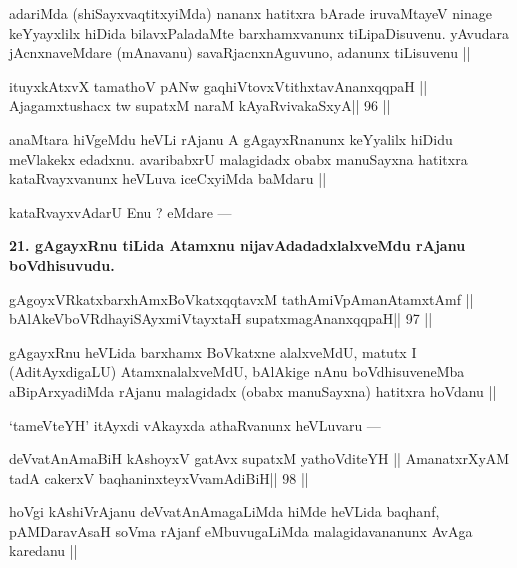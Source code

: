 \begin{artha}
adariMda (shiSayxvaqtitxyiMda) nananx hatitxra bArade iruvaMtayeV ninage keYyayxlilx hiDida bilavxPaladaMte barxhamxvanunx tiLipaDisuvenu. yAvudara jAcnxnaveMdare (mAnavanu) savaRjacnxnAguvuno, adanunx tiLisuvenu ||
\end{artha}

\begin{shl}
ituyxkAtxvX tamathoV pANw gaqhiVtovxVtithxtavAnanxqqpaH ||
Ajagamxtushacx tw supatxM naraM kAyaRvivakaSxyA\hfill || 96 ||
\end{shl}

\begin{artha}
anaMtara hiVgeMdu heVLi rAjanu A gAgayxRnanunx keYyalilx hiDidu meVlakekx edadxnu. avaribabxrU malagidadx obabx manuSayxna hatitxra kataRvayxvanunx heVLuva iceCxyiMda baMdaru ||
\end{artha} 
 
\begin{artha}
kataRvayxvAdarU Enu ? eMdare ---
\end{artha} 

\begin{artha}
{\bf 21. gAgayxRnu tiLida Atamxnu nijavAdadadxlalxveMdu rAjanu boVdhisuvudu.}
\end{artha}

\begin{shl}
gAgoyxVRkatxbarxhAmxBoVkatxqqtavxM tathA\s miVpAmanAtamxtAmf ||
bAlAkeVboVRdhayiSAyxmiVtayxtaH supatxmagAnanxqqpaH\hfill || 97 ||
\end{shl}

\begin{artha}
gAgayxRnu heVLida barxhamx BoVkatxne alalxveMdU, matutx I (AditAyxdigaLU) AtamxnalalxveMdU, bAlAkige nAnu boVdhisuveneMba aBipArxyadiMda rAjanu malagidadx (obabx manuSayxna) hatitxra hoVdanu ||
\end{artha}
 
\begin{artha}
`tameVteYH' itAyxdi vAkayxda athaRvanunx heVLuvaru ---
\end{artha}

\begin{shl}
deVvatAnAmaBiH kAshoyxV gatAvx supatxM yathoVditeYH ||
AmanatxrXyAM tadA cakerxV baqhaninxteyxVvamAdiBiH\hfill || 98 ||
\end{shl}

\begin{artha}
hoVgi kAshiVrAjanu deVvatAnAmagaLiMda hiMde heVLida baqhanf, pAMDaravAsaH soVma rAjanf eMbuvugaLiMda malagidavananunx AvAga karedanu ||
\end{artha}

